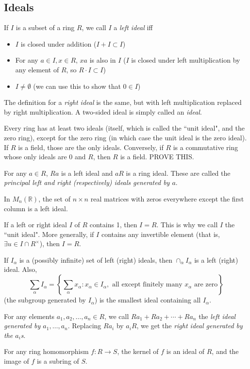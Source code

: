 \documentclass[12pt]{article}
\begin{document}
\subsection{Ideals}
If $I$ is a subset of a ring $R$, we call $I$ a \textit{left ideal} iff
\begin{itemize}
    \item $I$ is closed under addition ($I+I\subset I$)
    \item For any $a\in I, x \in R$, $xa$ is also in $I$ ($I$ is closed under left multiplication by any element of $R$, so $R\cdot I \subset I$)
    \item $I \neq \emptyset$ (we can use this to show that $0 \in I$)
\end{itemize}
The definition for a \textit{right ideal} is the same, but with left multiplication replaced by right multiplication. A two-sided ideal is simply called an \textit{ideal}.
\par
Every ring has at least two ideals (itself, which is called the ``unit ideal", and the zero ring), except for the zero ring (in which case the unit ideal is the zero ideal). If $R$ is a field, those are the only ideals. Conversely, if $R$ is a commutative ring whose only ideals are $0$ and $R$, then $R$ is a field. PROVE THIS.
\par
For any $a \in R$, $Ra$ is a left ideal and $aR$ is a ring ideal. These are called the \textit{principal left and right (respectively) ideals generated by $a$}.
\par
In $M_n( \mathbb{R})$, the set of $n \times n$ real matrices with zeros everywhere except the first column is a left ideal.
\par
If a left or right ideal $I$ of $R$ contains 1, then $I=R$. This is why we call $I$ the ``unit ideal". More generally, if $I$ contains any invertible element (that is, $\exists u \in I \cap R^\times$), then $I=R$.
\par
If $I_\alpha$ is a (possibly infinite) set of left (right) ideals, then $\cap_\alpha I_\alpha$ is a left (right) ideal. Also,
\[ \sum_\alpha I_\alpha = \left\{ \sum_\alpha x_\alpha : x_\alpha \in I_\alpha, \text{ all except finitely many $x_\alpha$ are zero} \right\} \]
(the subgroup generated by $I_\alpha$) is the smallest ideal containing all $I_\alpha$.
\par
For any elements $a_1, a_2, \dots, a_n \in R$, we call $Ra_1 + Ra_2 + \cdots + Ra_n$ the \textit{left ideal generated by $a_1, \dots, a_n$}. Replacing $Ra_i$ by $a_iR$, we get the \textit{right ideal generated by the $a_i$s}.
\par
For any ring homomorphism $f: R \rightarrow S$, the kernel of $f$ is an ideal of $R$, and the image of $f$ is a subring of $S$.
\end{document}
